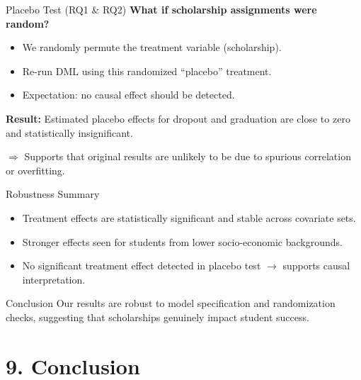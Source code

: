 \documentclass[aspectratio=169]{beamer}
\begin{document}
\begin{frame}{Placebo Test (RQ1 \& RQ2)}
\textbf{What if scholarship assignments were random?}
\vspace{10pt}

\begin{itemize}[label=--,itemsep=1pt]
    \item We randomly permute the treatment variable (scholarship).
    \item Re-run DML using this randomized “placebo” treatment.
    \item Expectation: no causal effect should be detected.
\end{itemize}

\vspace{10pt}
\textbf{Result:} Estimated placebo effects for dropout and graduation are close to zero and statistically insignificant.

\vspace{5pt}
$\Rightarrow$ Supports that original results are unlikely to be due to spurious correlation or overfitting.
\end{frame}


\begin{frame}{Robustness Summary}
\begin{itemize}[label=--,itemsep=1pt]
    \item Treatment effects are statistically significant and stable across covariate sets.
    \item Stronger effects seen for students from lower socio-economic backgrounds.
    \item No significant treatment effect detected in placebo test $\rightarrow$ supports causal interpretation.
\end{itemize}

\vspace{10pt}
\begin{block}{Conclusion}
Our results are robust to model specification and randomization checks, suggesting that scholarships genuinely impact student success.
\end{block}

\end{frame}

\section{9. Conclusion}
\end{document}
